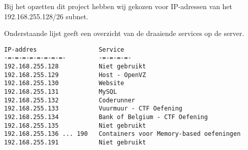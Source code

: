 Bij het opzetten dit project hebben wij gekozen voor IP-adressen van het 192.168.255.128/26 subnet.

Onderstaande lijst geeft een overzicht van de draaiende services op de server.

\begin{lstlisting}
IP-addres                 Service
-=-=-=-=-=-=-=-=-         -=-=-=-=-
192.168.255.128           Niet gebruikt
192.168.255.129           Host - OpenVZ
192.168.255.130           Website
192.168.255.131           MySQL
192.168.255.132           Coderunner
192.168.255.133           Vuurmuur - CTF Oefening
192.168.255.134           Bank of Belgium - CTF Oefening
192.168.255.135           Niet gebruikt
192.168.255.136 ... 190   Containers voor Memory-based oefeningen
192.168.255.191           Niet gebruikt
     
\end{lstlisting}
